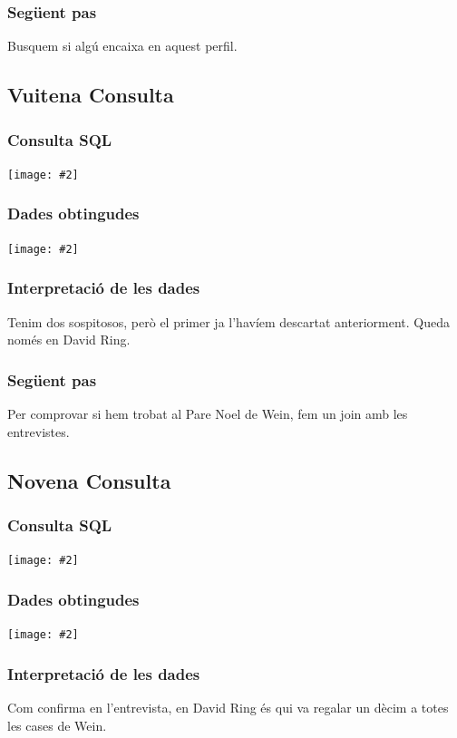 \documentclass[a4paper,12pt]{article}
\newcommand{\mygraphic}[2][width=\textwidth]{\begin{center}
		\centering\texttt{[image: \#2]}\par
\end{center}}
\begin{document}
\subsubsection{Següent pas}
Busquem si algú encaixa en aquest perfil.

\newpage
\subsection{Vuitena Consulta}

\subsubsection{Consulta SQL}
\mygraphic{imatges/15.png}

\subsubsection{Dades obtingudes}
\mygraphic{imatges/16.png}

\subsubsection{Interpretació de les dades}
Tenim dos sospitosos, però el primer ja l'havíem descartat anteriorment. Queda només en David Ring.

\subsubsection{Següent pas}
Per comprovar si hem trobat al Pare Noel de Wein, fem un join amb les entrevistes.

\newpage
\subsection{Novena Consulta}

\subsubsection{Consulta SQL}
\mygraphic{imatges/17.png}

\subsubsection{Dades obtingudes}
\mygraphic{imatges/18.png}

\subsubsection{Interpretació de les dades}
Com confirma en l'entrevista, en David Ring és qui va regalar un dècim a totes les cases de Wein.
\end{document}

